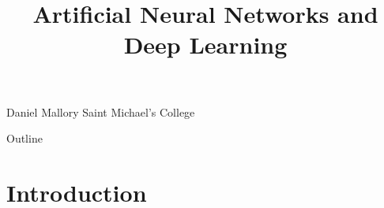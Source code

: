 \documentclass{beamer}
\title[ANNs, CNNs, and RNNs]{Artificial Neural Networks and Deep Learning}
\begin{document}
\begin{frame}
    \date{}
    \titlepage
    Daniel Mallory
    \newline
    Saint Michael's College
\end{frame}

\begin{frame}{Outline}
    \tableofcontents
\end{frame}

\section{Introduction}


\end{document}

